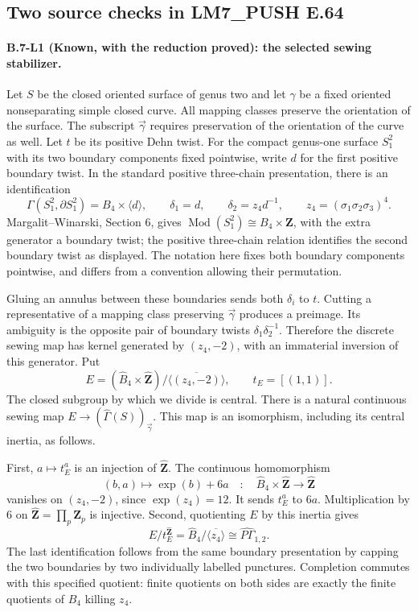 
\subsection{Two source checks in LM7\_PUSH E.64}

\paragraph{B.7-L1 (Known, with the reduction proved): the selected sewing stabilizer.}
Let $S$ be the closed oriented surface of genus two and let $\gamma$ be
a fixed oriented nonseparating simple closed curve. All mapping classes
preserve the orientation of the surface. The subscript $\vec\gamma$
requires preservation of the orientation of the curve as well.
Let $t$ be its positive Dehn twist. For the compact genus-one surface
$S_1^2$ with its two boundary components fixed pointwise, write $d$ for
the first positive boundary twist. In the standard positive three-chain
presentation, there is an identification
\[
 \Gamma(S_1^2,\partial S_1^2)=B_4\times\langle d\rangle,
 \qquad \delta_1=d,\qquad \delta_2=z_4d^{-1},
 \qquad z_4=(\sigma_1\sigma_2\sigma_3)^4.
\]
Margalit--Winarski, Section 6, gives $\operatorname{Mod}(S_1^2)
\cong B_4\times\mathbf Z$, with the extra generator a boundary twist;
the positive three-chain relation identifies the second boundary twist
as displayed. The notation here fixes both boundary components
pointwise, and differs from a convention allowing their permutation.

Gluing an annulus between these boundaries sends both $\delta_i$ to $t$.
Cutting a representative of a mapping class preserving $\vec\gamma$
produces a preimage. Its ambiguity is the opposite pair of boundary
twists $\delta_1\delta_2^{-1}$. Therefore the discrete sewing map has
kernel generated by $(z_4,-2)$, with an immaterial inversion of this
generator. Put
\[
 E=(\widehat B_4\times\widehat{\mathbf Z})/
       \overline{\langle(z_4,-2)\rangle},\qquad t_E=[(1,1)].
\]
The closed subgroup by which we divide is central. There is a natural
continuous sewing map $E\to(\widehat\Gamma(S))_{\vec\gamma}$.
This map is an isomorphism, including its central inertia, as follows.

First, $a\mapsto t_E^a$ is an injection of $\widehat{\mathbf Z}$.
The continuous homomorphism
\[
 (b,a)\longmapsto\operatorname{exp}(b)+6a
      \quad:\quad\widehat B_4\times\widehat{\mathbf Z}
           \longrightarrow\widehat{\mathbf Z}
\]
vanishes on $(z_4,-2)$, since $\operatorname{exp}(z_4)=12$.
It sends $t_E^a$ to $6a$. Multiplication by $6$ on
$\widehat{\mathbf Z}=\prod_p\mathbf Z_p$ is injective.
Second, quotienting $E$ by this inertia gives
\[
 E/t_E^{\widehat{\mathbf Z}}
   =\widehat B_4/\overline{\langle z_4\rangle}
   \cong\widehat{P\Gamma}_{1,2}.
\]
The last identification follows from the same boundary presentation by
capping the two boundaries by two individually labelled punctures.
Completion commutes with this specified quotient: finite quotients on
both sides are exactly the finite quotients of $B_4$ killing $z_4$.

